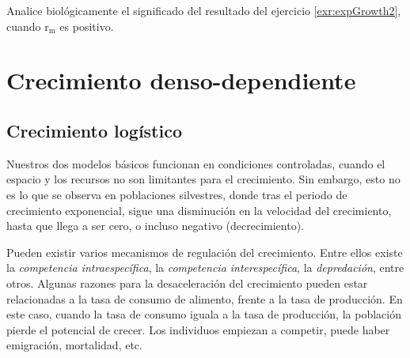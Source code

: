 \documentclass[12pt,letterpaper,]{book}
\let\BeginKnitrBlock\begin \let\EndKnitrBlock\end
\begin{document}
\BeginKnitrBlock{exercise}
\protect\hypertarget{exr:expGrowth4}{}{\label{exr:expGrowth4} }Analice
biológicamente el significado del resultado del ejercicio
\ref{exr:expGrowth2}, cuando \(\mathrm{r_m}\) es positivo.
\EndKnitrBlock{exercise}

\section{Crecimiento
denso-dependiente}\label{crecimiento-denso-dependiente}

\subsection{Crecimiento logístico}\label{crecimiento-logistico}

Nuestros dos modelos básicos funcionan en condiciones controladas,
cuando el espacio y los recursos no son limitantes para el crecimiento.
Sin embargo, esto no es lo que se observa en poblaciones silvestres,
donde tras el periodo de crecimiento exponencial, sigue una disminución
en la velocidad del crecimiento, hasta que llega a ser cero, o incluso
negativo (decrecimiento).

Pueden existir varios mecanismos de regulación del crecimiento. Entre
ellos existe la \emph{competencia intraespecífica}, la \emph{competencia
interespecífica}, la \emph{depredación}, entre otros. Algunas razones
para la desaceleración del crecimiento pueden estar relacionadas a la
tasa de consumo de alimento, frente a la tasa de producción. En este
caso, cuando la tasa de consumo iguala a la tasa de producción, la
población pierde el potencial de crecer. Los individuos empiezan a
competir, puede haber emigración, mortalidad, etc.
\end{document}
